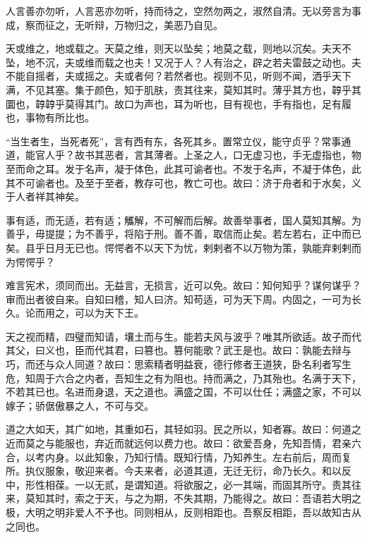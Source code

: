 人言善亦勿听，人言恶亦勿听，持而待之，空然勿两之，淑然自清。无以旁言为事成，察而征之，无听辩，万物归之，美恶乃自见。

天或维之，地或载之。天莫之维，则天以坠矣；地莫之载，则地以沉矣。夫天不坠，地不沉，夫或维而载之也夫！又况于人？人有治之，辟之若夫雷鼓之动也。夫不能自摇者，夫或摇之。夫或者何？若然者也。视则不见，听则不闻，洒乎天下满，不见其塞。集于颜色，知于肌肤，责其往来，莫知其时。薄乎其方也，韕乎其圜也，韕韕乎莫得其门。故口为声也，耳为听也，目有视也，手有指也，足有履也，事物有所比也。

“当生者生，当死者死”，言有西有东，各死其乡。置常立仪，能守贞乎？常事通道，能官人乎？故书其恶者，言其薄者。上圣之人，口无虚习也，手无虚指也，物至而命之耳。发于名声，凝于体色，此其可谕者也。不发于名声，不凝于体色，此其不可谕者也。及至于至者，教存可也，教亡可也。故曰：济于舟者和于水矣，义于人者祥其神矣。

事有适，而无适，若有适；觿解，不可解而后解。故善举事者，国人莫知其解。为善乎，毋提提；为不善乎，将陷于刑。善不善，取信而止矣。若左若右，正中而已矣。县乎日月无已也。愕愕者不以天下为忧，剌剌者不以万物为策，孰能弃剌剌而为愕愕乎？

难言宪术，须同而出。无益言，无损言，近可以免。故曰：知何知乎？谋何谋乎？审而出者彼自来。自知曰稽，知人曰济。知苟适，可为天下周。内固之，一可为长久。论而用之，可以为天下王。

天之视而精，四璧而知请，壤土而与生。能若夫风与波乎？唯其所欲适。故子而代其父，曰义也，臣而代其君，曰篡也。篡何能歌？武王是也。故曰：孰能去辩与巧，而还与众人同道？故曰：思索精者明益衰，德行修者王道狭，卧名利者写生危，知周于六合之内者，吾知生之有为阻也。持而满之，乃其殆也。名满于天下，不若其已也。名进而身退，天之道也。满盛之国，不可以仕任；满盛之家，不可以嫁子；骄倨傲暴之人，不可与交。

道之大如天，其广如地，其重如石，其轻如羽。民之所以，知者寡。故曰：何道之近而莫之与能服也，弃近而就远何以费力也。故曰：欲爱吾身，先知吾情，君亲六合，以考内身。以此知象，乃知行情。既知行情，乃知养生。左右前后，周而复所。执仪服象，敬迎来者。今夫来者，必道其道，无迁无衍，命乃长久。和以反中，形性相葆。一以无贰，是谓知道。将欲服之，必一其端，而固其所守。责其往来，莫知其时，索之于天，与之为期，不失其期，乃能得之。故曰：吾语若大明之极，大明之明非爱人不予也。同则相从，反则相距也。吾察反相距，吾以故知古从之同也。
